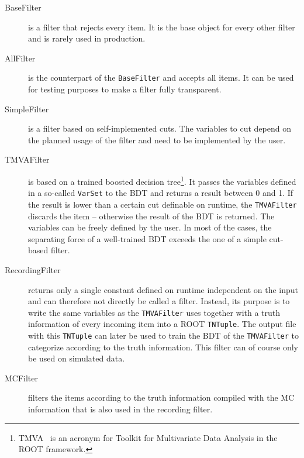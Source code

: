 \begin{description}
  \item[BaseFilter] is a filter that rejects every item. It is the base object for every other filter and is rarely used in production.
  \item[AllFilter] is the counterpart of the \texttt{BaseFilter} and accepts all items. It can be used for testing purposes to make a filter fully transparent.
  \item[SimpleFilter] is a filter based on self-implemented cuts. The variables to cut depend on the planned usage of the filter and need to be implemented by the user.
  \item[TMVAFilter] is based on a trained boosted decision tree\footnote{TMVA~\cite{tmva} is an acronym for Toolkit for Multivariate Data Analysis in the ROOT framework.}. It passes the variables defined in a so-called \texttt{VarSet} to the BDT and returns a result between 0 and 1. If the result is lower than a certain cut definable on runtime, the \texttt{TMVAFilter} discards the item -- otherwise the result of the BDT is returned. The variables can be freely defined by the user. In most of the cases, the separating force of a well-trained BDT exceeds the one of a simple cut-based filter.
  \item[RecordingFilter] returns only a single constant defined on runtime independent on the input and can therefore not directly be called a filter. Instead, its purpose is to write the same variables as the \texttt{TMVAFilter} uses together with a truth information of every incoming item into a ROOT \texttt{TNTuple}. The output file with this \texttt{TNTuple} can later be used to train the BDT of the \texttt{TMVAFilter} to categorize according to the truth information. This filter can of course only be used on simulated data.
  \item[MCFilter] filters the items according to the truth information compiled with the MC information that is also used in the recording filter.
\end{description}


